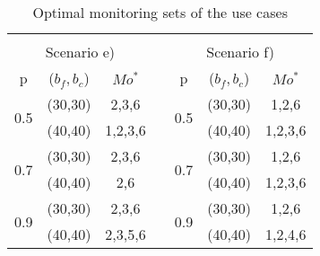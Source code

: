 \begin{table}[htbp]
{\begin{tabular}{ccccccc}
                                           &                                  &                              &                       &                                           &                                  &                              \\
\multicolumn{3}{c}{Scenario e)}                                                                              &                       & \multicolumn{3}{c}{Scenario f)}                                                                             \\ \cline{1-3} \cline{5-7} 
\multicolumn{1}{|c|}{p}                    & \multicolumn{1}{c|}{($b_f,b_c$)} & \multicolumn{1}{c|}{$Mo^*$}  & \multicolumn{1}{c|}{} & \multicolumn{1}{c|}{p}                    & \multicolumn{1}{c|}{($b_f,b_c$)} & \multicolumn{1}{c|}{$Mo^*$}  \\ \cline{1-3} \cline{5-7} 
\multicolumn{1}{|c|}{\multirow{2}{*}{0.5}} & \multicolumn{1}{c|}{(30,30)}     & \multicolumn{1}{c|}{2,3,6}   & \multicolumn{1}{c|}{} & \multicolumn{1}{c|}{\multirow{2}{*}{0.5}} & \multicolumn{1}{c|}{(30,30)}     & \multicolumn{1}{c|}{1,2,6}   \\ \cline{2-3} \cline{6-7} 
\multicolumn{1}{|c|}{}                     & \multicolumn{1}{c|}{(40,40)}     & \multicolumn{1}{c|}{1,2,3,6} & \multicolumn{1}{c|}{} & \multicolumn{1}{c|}{}                     & \multicolumn{1}{c|}{(40,40)}     & \multicolumn{1}{c|}{1,2,3,6} \\ \cline{1-3} \cline{5-7} 
\multicolumn{1}{|c|}{\multirow{2}{*}{0.7}} & \multicolumn{1}{c|}{(30,30)}     & \multicolumn{1}{c|}{2,3,6}   & \multicolumn{1}{c|}{} & \multicolumn{1}{c|}{\multirow{2}{*}{0.7}} & \multicolumn{1}{c|}{(30,30)}     & \multicolumn{1}{c|}{1,2,6}   \\ \cline{2-3} \cline{6-7} 
\multicolumn{1}{|c|}{}                     & \multicolumn{1}{c|}{(40,40)}     & \multicolumn{1}{c|}{2,6}     & \multicolumn{1}{c|}{} & \multicolumn{1}{c|}{}                     & \multicolumn{1}{c|}{(40,40)}     & \multicolumn{1}{c|}{1,2,3,6} \\ \cline{1-3} \cline{5-7} 
\multicolumn{1}{|c|}{\multirow{2}{*}{0.9}} & \multicolumn{1}{c|}{(30,30)}     & \multicolumn{1}{c|}{2,3,6}   & \multicolumn{1}{c|}{} & \multicolumn{1}{c|}{\multirow{2}{*}{0.9}} & \multicolumn{1}{c|}{(30,30)}     & \multicolumn{1}{c|}{1,2,6}   \\ \cline{2-3} \cline{6-7} 
\multicolumn{1}{|c|}{}                     & \multicolumn{1}{c|}{(40,40)}     & \multicolumn{1}{c|}{2,3,5,6} & \multicolumn{1}{c|}{} & \multicolumn{1}{c|}{}                     & \multicolumn{1}{c|}{(40,40)}     & \multicolumn{1}{c|}{1,2,4,6} \\ \cline{1-3} \cline{5-7} 
\end{tabular}%
}
\caption{Optimal monitoring sets of the use cases}
\label{tab:mdp-usecase-optiset}
\end{table}